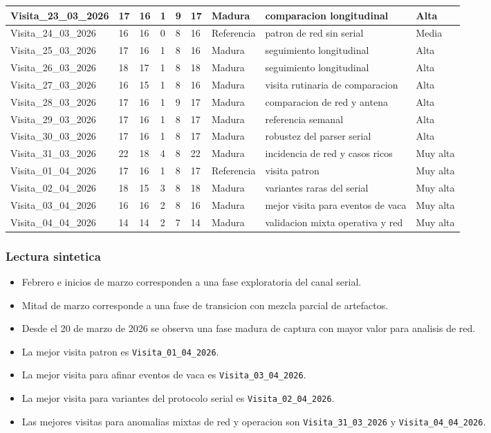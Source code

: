 \begin{longtable}{|p{3.0cm}|p{1.2cm}|p{1.2cm}|p{1.2cm}|p{1.2cm}|p{1.2cm}|p{2.2cm}|p{3.4cm}|p{1.7cm}|}
\hline
Visita\_23\_03\_2026 & 17 & 16 & 1 & 9 & 17 & Madura & comparacion longitudinal & Alta \\
\hline
Visita\_24\_03\_2026 & 16 & 16 & 0 & 8 & 16 & Referencia & patron de red sin serial & Media \\
\hline
Visita\_25\_03\_2026 & 17 & 16 & 1 & 8 & 16 & Madura & seguimiento longitudinal & Alta \\
\hline
Visita\_26\_03\_2026 & 18 & 17 & 1 & 8 & 18 & Madura & seguimiento longitudinal & Alta \\
\hline
Visita\_27\_03\_2026 & 16 & 15 & 1 & 8 & 16 & Madura & visita rutinaria de comparacion & Alta \\
\hline
Visita\_28\_03\_2026 & 17 & 16 & 1 & 9 & 17 & Madura & comparacion de red y antena & Alta \\
\hline
Visita\_29\_03\_2026 & 17 & 16 & 1 & 8 & 17 & Madura & referencia semanal & Alta \\
\hline
Visita\_30\_03\_2026 & 17 & 16 & 1 & 8 & 17 & Madura & robustez del parser serial & Alta \\
\hline
Visita\_31\_03\_2026 & 22 & 18 & 4 & 8 & 22 & Madura & incidencia de red y casos ricos & Muy alta \\
\hline
Visita\_01\_04\_2026 & 17 & 16 & 1 & 8 & 17 & Referencia & visita patron & Muy alta \\
\hline
Visita\_02\_04\_2026 & 18 & 15 & 3 & 8 & 18 & Madura & variantes raras del serial & Muy alta \\
\hline
Visita\_03\_04\_2026 & 16 & 16 & 2 & 8 & 16 & Madura & mejor visita para eventos de vaca & Muy alta \\
\hline
Visita\_04\_04\_2026 & 14 & 14 & 2 & 7 & 14 & Madura & validacion mixta operativa y red & Muy alta \\
\hline
\end{longtable}

\subsubsection{Lectura sintetica}

\begin{itemize}
\item Febrero e inicios de marzo corresponden a una fase exploratoria del canal serial.
\item Mitad de marzo corresponde a una fase de transicion con mezcla parcial de artefactos.
\item Desde el 20 de marzo de 2026 se observa una fase madura de captura con mayor valor para analisis de red.
\item La mejor visita patron es \texttt{Visita\_01\_04\_2026}.
\item La mejor visita para afinar eventos de vaca es \texttt{Visita\_03\_04\_2026}.
\item La mejor visita para variantes del protocolo serial es \texttt{Visita\_02\_04\_2026}.
\item Las mejores visitas para anomalias mixtas de red y operacion son \texttt{Visita\_31\_03\_2026} y \texttt{Visita\_04\_04\_2026}.
\end{itemize}


